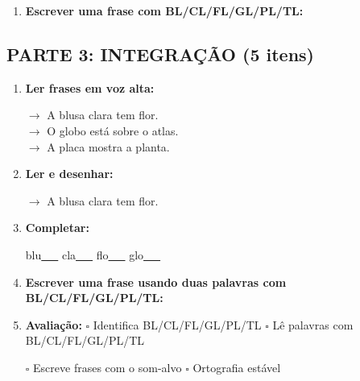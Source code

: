 \begin{exercicio}
\begin{enumerate}[resume]
  \item \textbf{Escrever uma frase com BL/CL/FL/GL/PL/TL:}
  \begin{center}
  \underline{\hspace{12cm}}
  \end{center}

\end{enumerate}

\subsection*{PARTE 3: INTEGRAÇÃO (5 itens)}

\begin{enumerate}[resume]

  \item \textbf{Ler frases em voz alta:}
  \begin{center}
  $\rightarrow$ A blusa clara tem flor.\\
  $\rightarrow$ O globo está sobre o atlas.\\
  $\rightarrow$ A placa mostra a planta.\\
  \end{center}

  \item \textbf{Ler e desenhar:}
  \begin{center}
  $\rightarrow$ A blusa clara tem flor.
  \end{center}
  \begin{center}
  \end{center}

  \item \textbf{Completar:}
  \begin{center}
  blu\underline{~~~} \quad cla\underline{~~~} \quad flo\underline{~~~} \quad glo\underline{~~~}
  \end{center}

  \item \textbf{Escrever uma frase usando duas palavras com BL/CL/FL/GL/PL/TL:}
  \begin{center}
  \underline{\hspace{12cm}}
  \end{center}

  \item \textbf{Avaliação:} $\square$ Identifica BL/CL/FL/GL/PL/TL \quad $\square$ Lê palavras com BL/CL/FL/GL/PL/TL
  \begin{center}
  $\square$ Escreve frases com o som-alvo \quad $\square$ Ortografia estável
  \end{center}


\end{enumerate}
\end{exercicio}
